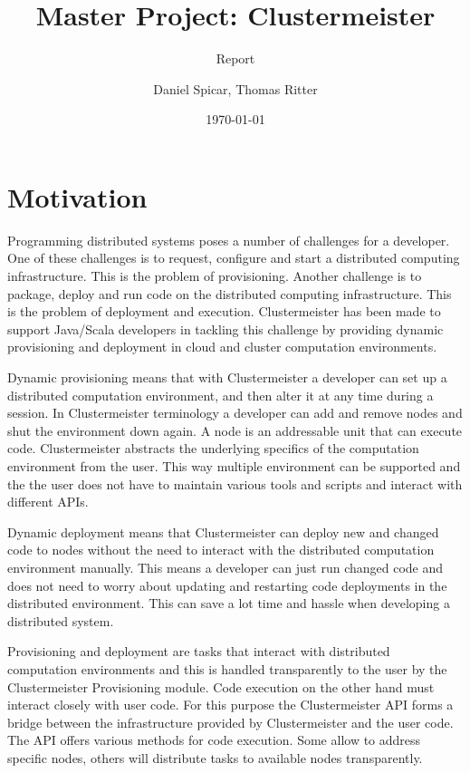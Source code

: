 \documentclass[english]{uzhpub}
\begin{document}
\title{Master Project: Clustermeister}

\subtitle{Report}

\author{Daniel Spicar, Thomas Ritter}

\date{\today}

\maketitle


\section{Motivation}

Programming distributed systems poses a number of challenges for a developer. One of these challenges is to request, configure and start a distributed computing infrastructure. This is the problem of provisioning. Another challenge is to package, deploy and run code on the distributed computing infrastructure. This is the problem of deployment and execution. Clustermeister has been made to support Java/Scala developers in tackling this challenge by providing dynamic provisioning and deployment in cloud and cluster computation environments.

Dynamic provisioning means that with Clustermeister a developer can set up a distributed computation environment, and then alter it at any time during a session. In Clustermeister terminology a developer can add and remove nodes and shut the environment down again. A node is an addressable unit that can execute code. Clustermeister abstracts the underlying specifics of the computation environment from the user. This way multiple environment can be supported and the the user does not have to maintain various tools and scripts and interact with different APIs.

Dynamic deployment means that Clustermeister can deploy new and changed code to nodes without the need to interact with the distributed computation environment manually. This means a developer can just run changed code and does not need to worry about updating and restarting code deployments in the distributed environment. This can save a lot time and hassle when developing a distributed system.

Provisioning and deployment are tasks that interact with distributed computation environments and this is handled transparently to the user by the Clustermeister Provisioning module. Code execution on the other hand must interact closely with user code. For this purpose the Clustermeister API forms a bridge between the infrastructure provided by Clustermeister and the user code. The API offers various methods for code execution. Some allow to address specific nodes, others will distribute tasks to available nodes transparently.
\end{document}
